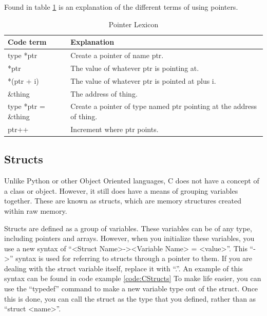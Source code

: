 \documentclass[a4paper,11pt]{report}
\begin{document}
			Found in table \ref{tab:PointerLexicon} is an explanation of the different terms of using pointers. 
			
			\begin{table}[htb]
				\centering
				\begin{tabular}{| l | p{8cm} |}
					\hline
					\textbf{Code term} & \textbf{Explanation} \\ \hline 
					type *ptr & Create a pointer of name ptr. \\ \hline
					*ptr & The value of whatever ptr is pointing at. \\ \hline
					*(ptr + i) & The value of whatever ptr is pointed at plus i. \\ \hline
					\&thing & The address of thing. \\ \hline
					type *ptr = \&thing & Create a pointer of type named ptr pointing at the address of thing. \\ \hline
					ptr++ & Increment where ptr points. \\ \hline
				\end{tabular}
				\caption{Pointer Lexicon}
				\label{tab:PointerLexicon}
			\end{table}
		\subsection{Structs}
			Unlike Python or other Object Oriented languages, C does not have a concept of a class or object. 
			However, it still does have a means of grouping variables together. 
			These are known as structs, which are memory structures created within raw memory.

			Structs are defined as a group of variables. 
			These variables can be of any type, including pointers and arrays. 
			However, when you initialize these variables, you use a new syntax of ``<Struct Name>-><Variable Name> = <value>''. 
			This ``->'' syntax is used for referring to structs through a pointer to them. 
			If you are dealing with the struct variable itself, replace it with ``.''. 
			An example of this syntax can be found in code example \ref{code:CStructs}	
			To make life easier, you can use the ``typedef'' command to make a new variable type out of the struct. 
			Once this is done, you can call the struct as the type that you defined, rather than as ``struct <name>''. 

			\begin{code}
				C}]{./CStructs.c}
				\caption{Example of a C Struct}
				\label{code:CStructs}
			\end{code}
\end{document}

